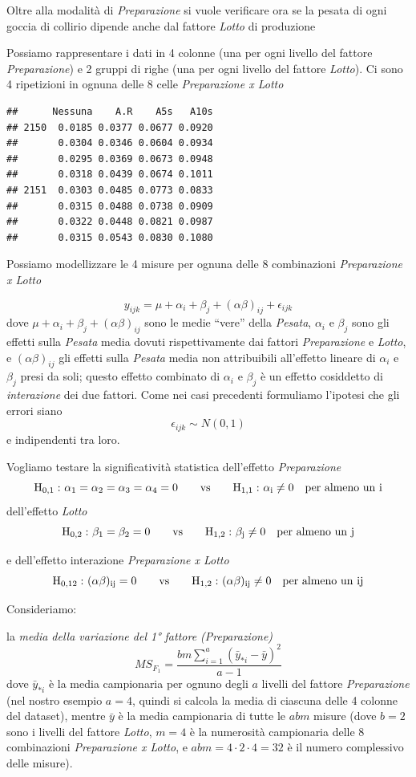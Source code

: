 \documentclass[
  11pt,
]{book}
\begin{document}
Oltre alla modalità di \emph{Preparazione} si vuole verificare ora se la pesata di ogni goccia di collirio dipende anche
dal fattore \emph{Lotto} di produzione

Possiamo rappresentare i dati in 4 colonne (una per ogni livello del fattore \emph{Preparazione}) e
2 gruppi di righe (una per ogni livello del fattore \emph{Lotto}). Ci sono 4 ripetizioni in ognuna delle 8 celle
\emph{Preparazione x Lotto}

\begin{verbatim}
##      Nessuna    A.R    A5s   A10s
## 2150  0.0185 0.0377 0.0677 0.0920
##       0.0304 0.0346 0.0604 0.0934
##       0.0295 0.0369 0.0673 0.0948
##       0.0318 0.0439 0.0674 0.1011
## 2151  0.0303 0.0485 0.0773 0.0833
##       0.0315 0.0488 0.0738 0.0909
##       0.0322 0.0448 0.0821 0.0987
##       0.0315 0.0543 0.0830 0.1080
\end{verbatim}

Possiamo modellizzare le 4 misure per ognuna delle 8 combinazioni \emph{Preparazione x Lotto}

\[
y_{ijk}=\mu+\alpha_{i}+\beta_{j}+(\alpha \beta)_{ij}+\epsilon_{ijk}
\]
dove \(\mu+\alpha_{i}+\beta_{j}+(\alpha \beta)_{ij}\) sono le medie ``vere'' della \emph{Pesata}, \(\alpha_i\) e \(\beta_j\) sono gli effetti sulla \emph{Pesata} media dovuti rispettivamente dai fattori \emph{Preparazione} e \emph{Lotto}, e \((\alpha \beta)_{ij}\) gli effetti sulla \emph{Pesata} media non attribuibili all'effetto lineare di \(\alpha_i\) e \(\beta_j\) presi da soli; questo effetto combinato di \(\alpha_i\) e \(\beta_j\) è un effetto cosiddetto di \emph{interazione} dei due fattori.
Come nei casi precedenti formuliamo l'ipotesi che gli errori siano
\[
\epsilon_{ijk} \sim N(0,1)
\]
e indipendenti tra loro.

Vogliamo testare la significatività statistica dell'effetto \emph{Preparazione}
\[
\rm{H_{0,1}:\ } \alpha_{1}=\alpha_{2}=\alpha_{3}=\alpha_{4}=0 \qquad \rm{vs} \qquad \rm{H_{1,1}:\ } \alpha_{i}\neq 0 \quad \rm{per \ almeno \ un} \ i
\]
dell'effetto \emph{Lotto}
\[
\rm{H_{0,2}:\ } \beta_{1}=\beta_{2}=0 \qquad \rm{vs} \qquad \rm{H_{1,2}:\ } \beta_{j}\neq 0 \quad \rm{per \ almeno \ un} \ j
\]

e dell'effetto interazione \emph{Preparazione x Lotto}
\[
\rm{H_{0,12}:\ } (\alpha \beta)_{ij}=0 \qquad \rm{vs} \qquad \rm{H_{1,2}:\ } (\alpha \beta)_{ij}\neq 0 \quad \rm{per \ almeno \ un} \ ij
\]

Consideriamo:

la \emph{media della variazione del 1° fattore (Preparazione)}
\[
MS_{F_1}=\frac{bm\sum_{i=1}^a(\bar{y}_{*i} -\bar{y})^2}{a-1}
\]
dove \(\bar{y}_{*i}\) è la media campionaria per ognuno degli \(a\) livelli del fattore \emph{Preparazione} (nel nostro esempio \(a=4\), quindi si calcola la media di ciascuna delle 4 colonne del dataset), mentre \(\bar{y}\) è la media campionaria di tutte le \(abm\) misure (dove \(b=2\) sono i livelli del fattore \emph{Lotto}, \(m=4\) è la numerosità campionaria delle 8 combinazioni \emph{Preparazione x Lotto}, e \(abm= 4·2·4=32\) è il numero complessivo delle misure).
\end{document}
